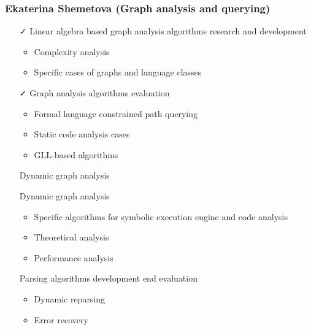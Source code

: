 \documentclass[xcolor=table,aspectratio=169]{beamer}
\begin{document}
\begin{frame}[fragile]
  \frametitle{Ekaterina Shemetova (Graph analysis and querying)}
  \begin{minipage}[t]{0.48\textwidth}
    \begin{itemize}
      \item[\faCheck] Linear algebra based graph analysis algorithms research and development 
      \begin{itemize}
        \item Complexity analysis
        \item Specific cases of graphs and language classes        
      \end{itemize}
      \item[\faCheck] Graph analysis algorithms evaluation
      \begin{itemize}
        \item Formal language constrained path querying
        \item Static code analysis cases
        \item GLL-based algorithms
      \end{itemize}            
      \item[\faGears] Dynamic graph analysis
    \end{itemize}
  \end{minipage}
  \pause
  \begin{minipage}[t]{0.48\textwidth}
    \begin{itemize}
      \item[\faHourglassHalf] Dynamic graph analysis
      \begin{itemize}
        \item Specific algorithms for symbolic execution engine and code analysis
        \item Theoretical analysis
        \item Performance analysis        
      \end{itemize}      
      \item[\faHourglassHalf] Parsing algorithms development end evaluation
      \begin{itemize}
        \item Dynamic reparsing
        \item Error recovery        
      \end{itemize}      
    \end{itemize}
  \end{minipage}
\end{frame}
\end{document}
